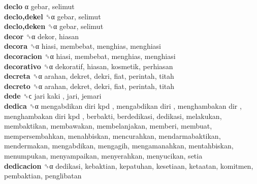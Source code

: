 \textbf{declo} α  gebar, selimut  \\
\textbf{declo,dekel} ␝α  gebar, selimut  \\
\textbf{declo,deken} ␝α  gebar, selimut  \\
\textbf{decor} ␝α  dekor, hiasan  \\
\textbf{decora} ␝α  hiasi, membebat, menghias, menghiasi  \\
\textbf{decoracion} ␝α  hiasi, membebat, menghias, menghiasi  \\
\textbf{decorativo} ␝α  dekoratif, hiasan, kosmetik, perhiasan  \\
\textbf{decreta} ␝α  arahan, dekret, dekri, fiat, perintah, titah  \\
\textbf{decreto} ␝α  arahan, dekret, dekri, fiat, perintah, titah  \\
\textbf{dede} ␝ϲ   jari kaki , jari, jemari  \\
\textbf{dedica} ␝α   mengabdikan diri kpd ,  mengabdikan diri ,  menghambakan dir ,  menghambakan diri kpd , berbakti, berdedikasi, dedikasi, melakukan, membaktikan, membawakan, membelanjakan, memberi, membuat, mempersembahkan, menahbiskan, mencurahkan, mendarmabaktikan, mendermakan, mengabdikan, mengagih, mengamanahkan, mentahbiskan, menumpukan, menyampaikan, menyerahkan, menyucikan, setia  \\
\textbf{dedicacion} ␝α  dedikasi, kebaktian, kepatuhan, kesetiaan, ketaatan, komitmen, pembaktian, penglibatan  \\
